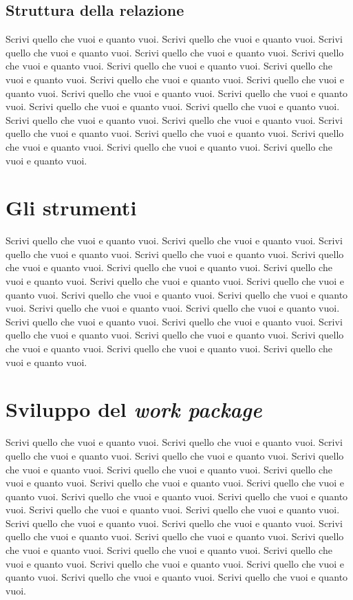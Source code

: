 \documentclass[10pt,a4paper,twoside]{memoir} %
\begin{document}
\section{Struttura della relazione}
\label{subesection:Struttura della relazione}
Scrivi quello che vuoi e quanto vuoi. Scrivi quello che vuoi e quanto vuoi.
Scrivi quello che vuoi e quanto vuoi. Scrivi quello che vuoi e quanto vuoi.
Scrivi quello che vuoi e quanto vuoi. Scrivi quello che vuoi e quanto vuoi.
Scrivi quello che vuoi e quanto vuoi. Scrivi quello che vuoi e quanto vuoi.
Scrivi quello che vuoi e quanto vuoi. Scrivi quello che vuoi e quanto vuoi.
Scrivi quello che vuoi e quanto vuoi. Scrivi quello che vuoi e quanto vuoi.
Scrivi quello che vuoi e quanto vuoi. Scrivi quello che vuoi e quanto vuoi.
Scrivi quello che vuoi e quanto vuoi. Scrivi quello che vuoi e quanto vuoi.
Scrivi quello che vuoi e quanto vuoi. Scrivi quello che vuoi e quanto vuoi.
Scrivi quello che vuoi e quanto vuoi. Scrivi quello che vuoi e quanto vuoi.

\chapter{Gli strumenti}
\label{section:Gli strumenti} %
Scrivi quello che vuoi e quanto vuoi. Scrivi quello che vuoi e quanto vuoi.
Scrivi quello che vuoi e quanto vuoi. Scrivi quello che vuoi e quanto vuoi.
Scrivi quello che vuoi e quanto vuoi. Scrivi quello che vuoi e quanto vuoi.
Scrivi quello che vuoi e quanto vuoi. Scrivi quello che vuoi e quanto vuoi.
Scrivi quello che vuoi e quanto vuoi. Scrivi quello che vuoi e quanto vuoi.
Scrivi quello che vuoi e quanto vuoi. Scrivi quello che vuoi e quanto vuoi.
Scrivi quello che vuoi e quanto vuoi. Scrivi quello che vuoi e quanto vuoi.
Scrivi quello che vuoi e quanto vuoi. Scrivi quello che vuoi e quanto vuoi.
Scrivi quello che vuoi e quanto vuoi. Scrivi quello che vuoi e quanto vuoi.
Scrivi quello che vuoi e quanto vuoi. Scrivi quello che vuoi e quanto vuoi.

\chapter{Sviluppo del \textit{work package}}
\label{section:Sviluppo del work package}
Scrivi quello che vuoi e quanto vuoi. Scrivi quello che vuoi e quanto vuoi.
Scrivi quello che vuoi e quanto vuoi. Scrivi quello che vuoi e quanto vuoi.
Scrivi quello che vuoi e quanto vuoi. Scrivi quello che vuoi e quanto vuoi.
Scrivi quello che vuoi e quanto vuoi. Scrivi quello che vuoi e quanto vuoi.
Scrivi quello che vuoi e quanto vuoi. Scrivi quello che vuoi e quanto vuoi.
Scrivi quello che vuoi e quanto vuoi. Scrivi quello che vuoi e quanto vuoi.
Scrivi quello che vuoi e quanto vuoi. Scrivi quello che vuoi e quanto vuoi.
Scrivi quello che vuoi e quanto vuoi. Scrivi quello che vuoi e quanto vuoi.
Scrivi quello che vuoi e quanto vuoi. Scrivi quello che vuoi e quanto vuoi.
Scrivi quello che vuoi e quanto vuoi. Scrivi quello che vuoi e quanto vuoi.
Scrivi quello che vuoi e quanto vuoi. Scrivi quello che vuoi e quanto vuoi.
Scrivi quello che vuoi e quanto vuoi. Scrivi quello che vuoi e quanto vuoi.
\end{document}
